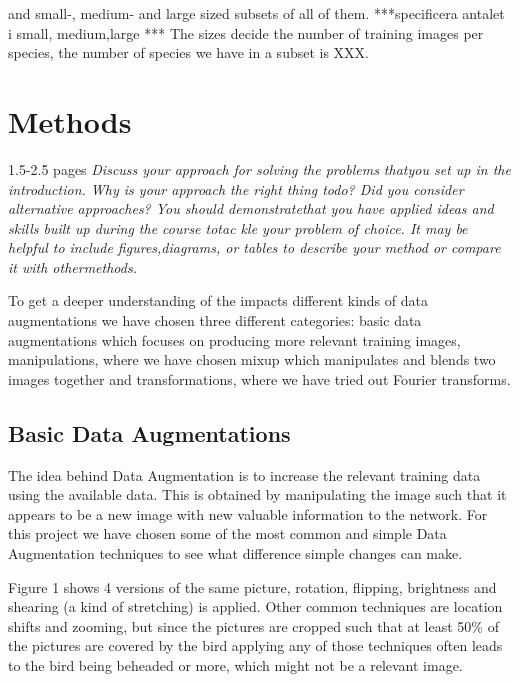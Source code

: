 \documentclass{article}
\begin{document}
and small-, medium- and large sized subsets of all of them.
***specificera antalet i small, medium,large ***
The sizes decide the number of training images per species, the number of species we have in a subset is XXX.
 

\section{Methods}

1.5-2.5 pages
\textit{Discuss your approach for solving the problems thatyou set up in the introduction. Why is your approach the right thing todo? Did you consider alternative approaches? You should demonstratethat you have applied ideas and skills built up during the course totac	kle  your  problem  of  choice.   It  may  be  helpful  to  include  figures,diagrams, or tables to describe your method or compare it with othermethods.}

To get a deeper understanding of the impacts different kinds of data augmentations we have chosen three different categories: basic data augmentations which focuses on producing more relevant training images, manipulations, where we have chosen mixup which manipulates and blends two images together and transformations, where we have tried out Fourier transforms. 

\subsection{Basic Data Augmentations}
The idea behind Data Augmentation is to increase the relevant training data using the available data. This is obtained by manipulating the image such that it appears to be a new image with new valuable information to the network. For this project we have chosen some of the most common and simple Data Augmentation techniques to see what difference simple changes can make.

Figure 1 shows 4 versions of the same picture, rotation, flipping, brightness and shearing (a kind of stretching) is applied. Other common techniques are location shifts and zooming, but since the pictures are cropped such that at least 50\% of the pictures are covered by the bird applying any of those techniques often leads to the bird being beheaded  or more, which might not be a relevant image.
\end{document}
